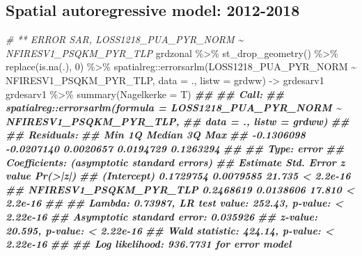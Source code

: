 \documentclass[10pt,landscape,a3paper]{article}
\newenvironment{Shaded}{\begin{snugshade}}{\end{snugshade}}
\newcommand{\AttributeTok}[1]{\textcolor[rgb]{0.77,0.63,0.00}{#1}}
\newcommand{\CommentTok}[1]{\textcolor[rgb]{0.56,0.35,0.01}{\textit{#1}}}
\newcommand{\DecValTok}[1]{\textcolor[rgb]{0.00,0.00,0.81}{#1}}
\newcommand{\DocumentationTok}[1]{\textcolor[rgb]{0.56,0.35,0.01}{\textbf{\textit{#1}}}}
\newcommand{\FunctionTok}[1]{\textcolor[rgb]{0.00,0.00,0.00}{#1}}
\newcommand{\NormalTok}[1]{#1}
\newcommand{\OtherTok}[1]{\textcolor[rgb]{0.56,0.35,0.01}{#1}}
\newcommand{\SpecialCharTok}[1]{\textcolor[rgb]{0.00,0.00,0.00}{#1}}
\begin{document}
\hypertarget{spatial-autoregressive-model-2012-2018}{%
\subsection{Spatial autoregressive model:
2012-2018}\label{spatial-autoregressive-model-2012-2018}}

\begin{Shaded}
\begin{Highlighting}[]
\CommentTok{\# ** ERROR SAR, LOSS1218\_PUA\_PYR\_NORM \textasciitilde{} NFIRESV1\_PSQKM\_PYR\_TLP}
\NormalTok{grdzonal }\SpecialCharTok{\%\textgreater{}\%}
    \FunctionTok{st\_drop\_geometry}\NormalTok{() }\SpecialCharTok{\%\textgreater{}\%}
    \FunctionTok{replace}\NormalTok{(}\FunctionTok{is.na}\NormalTok{(.), }\DecValTok{0}\NormalTok{) }\SpecialCharTok{\%\textgreater{}\%}
\NormalTok{    spatialreg}\SpecialCharTok{::}\FunctionTok{errorsarlm}\NormalTok{(LOSS1218\_PUA\_PYR\_NORM }\SpecialCharTok{\textasciitilde{}}\NormalTok{ NFIRESV1\_PSQKM\_PYR\_TLP, }\AttributeTok{data =}\NormalTok{ .,}
        \AttributeTok{listw =}\NormalTok{ grdww) }\OtherTok{{-}\textgreater{}}\NormalTok{ grdesarv1}
\NormalTok{grdesarv1 }\SpecialCharTok{\%\textgreater{}\%}
    \FunctionTok{summary}\NormalTok{(}\AttributeTok{Nagelkerke =}\NormalTok{ T)}
\DocumentationTok{\#\# }
\DocumentationTok{\#\# Call:}
\DocumentationTok{\#\# spatialreg::errorsarlm(formula = LOSS1218\_PUA\_PYR\_NORM \textasciitilde{} NFIRESV1\_PSQKM\_PYR\_TLP, }
\DocumentationTok{\#\#     data = ., listw = grdww)}
\DocumentationTok{\#\# }
\DocumentationTok{\#\# Residuals:}
\DocumentationTok{\#\#        Min         1Q     Median         3Q        Max }
\DocumentationTok{\#\# {-}0.1306098 {-}0.0207140  0.0020657  0.0194729  0.1263294 }
\DocumentationTok{\#\# }
\DocumentationTok{\#\# Type: error }
\DocumentationTok{\#\# Coefficients: (asymptotic standard errors) }
\DocumentationTok{\#\#                         Estimate Std. Error z value  Pr(\textgreater{}|z|)}
\DocumentationTok{\#\# (Intercept)            0.1729754  0.0079585  21.735 \textless{} 2.2e{-}16}
\DocumentationTok{\#\# NFIRESV1\_PSQKM\_PYR\_TLP 0.2468619  0.0138606  17.810 \textless{} 2.2e{-}16}
\DocumentationTok{\#\# }
\DocumentationTok{\#\# Lambda: 0.73987, LR test value: 252.43, p{-}value: \textless{} 2.22e{-}16}
\DocumentationTok{\#\# Asymptotic standard error: 0.035926}
\DocumentationTok{\#\#     z{-}value: 20.595, p{-}value: \textless{} 2.22e{-}16}
\DocumentationTok{\#\# Wald statistic: 424.14, p{-}value: \textless{} 2.22e{-}16}
\DocumentationTok{\#\# }
\DocumentationTok{\#\# Log likelihood: 936.7731 for error model}

\end{Highlighting}
\end{Shaded}
\end{document}
